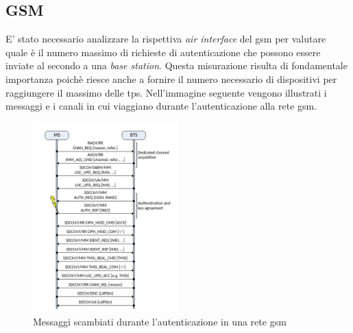 \subsection{GSM}
E' stato necessario analizzare la rispettiva \textit{air interface} del \gls{gsm} per valutare quale è il numero massimo di richieste di autenticazione 
che possono essere inviate al secondo a una \textit{base station}. Questa misurazione risulta di fondamentale importanza poichè riesce anche a fornire il numero necessario 
di dispositivi per raggiungere il massimo delle \gls{tps}.
Nell'immagine seguente vengono illustrati i messaggi e i canali in cui viaggiano durante l'autenticazione alla rete \gls{gsm}.
\begin{figure}[h]
    \centering
    \includegraphics[width=0.5\textwidth]{images/gsm-air-channel.png}
    \caption{Messaggi scambiati durante l'autenticazione in una rete \gls{gsm}\cite{gsm-dos-simless}}
\end{figure}

\clearpage

